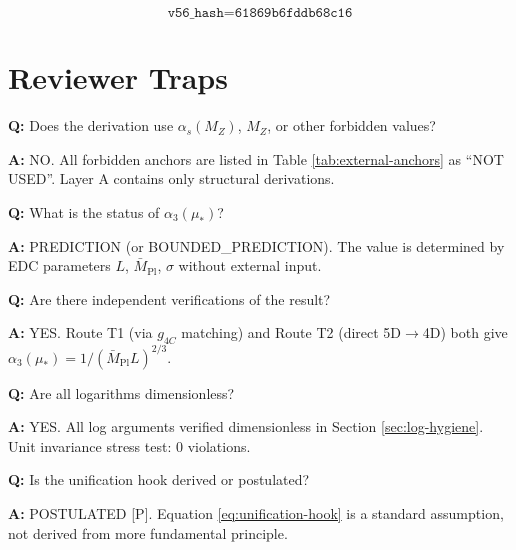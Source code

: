 \documentclass[11pt,a4paper]{article}
\theoremstyle{definition}
\begin{document}
\begin{hashbox}
\begin{equation}
\label{eq:v56-hash}
\texttt{v56\_hash} = \texttt{61869b6fddb68c16}
\end{equation}
\end{hashbox}

\section{Reviewer Traps}
\label{sec:traps}

\begin{trapbox}
\textbf{Q:} Does the derivation use $\alpha_s(M_Z)$, $M_Z$, or other forbidden values?

\textbf{A:} NO. All forbidden anchors are listed in Table \ref{tab:external-anchors}
as ``NOT USED''. Layer A contains only structural derivations.
\end{trapbox}

\begin{trapbox}
\textbf{Q:} What is the status of $\alpha_3(\mu_*)$?

\textbf{A:} PREDICTION (or BOUNDED\_PREDICTION). The value is determined by
EDC parameters $L$, $\bar{M}_{\text{Pl}}$, $\sigma$ without external input.
\end{trapbox}

\begin{trapbox}
\textbf{Q:} Are there independent verifications of the result?

\textbf{A:} YES. Route T1 (via $g_{4C}$ matching) and Route T2 (direct 5D$\to$4D)
both give $\alpha_3(\mu_*) = 1/(\bar{M}_{\text{Pl}} L)^{2/3}$.
\end{trapbox}

\begin{trapbox}
\textbf{Q:} Are all logarithms dimensionless?

\textbf{A:} YES. All log arguments verified dimensionless in Section \ref{sec:log-hygiene}.
Unit invariance stress test: 0 violations.
\end{trapbox}

\begin{trapbox}
\textbf{Q:} Is the unification hook derived or postulated?

\textbf{A:} POSTULATED [P]. Equation \eqref{eq:unification-hook} is a standard
assumption, not derived from more fundamental principle.
\end{trapbox}
\end{document}

